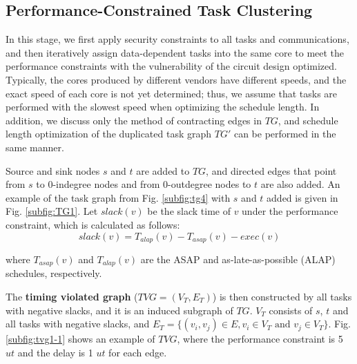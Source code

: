 \documentclass[10pt,journal, compsoc]{IEEEtran}
\begin{document}
\subsection{Performance-Constrained Task Clustering}

In this stage, we first apply security constraints to all tasks and communications, and then iteratively assign data-dependent tasks into the same core to meet the performance constraints with the vulnerability of the circuit design optimized. Typically, the cores produced by different vendors have different speeds, and the exact speed of each core is not yet determined; thus, we assume that tasks are performed with the slowest speed when optimizing the schedule length. In addition, we discuss only the method of contracting edges in $TG$, and schedule length optimization of the duplicated task graph $TG'$ can be performed in the same manner.

Source and sink nodes $s$ and $t$ are added to $TG$, and directed edges that point from $s$ to 0-indegree nodes and from 0-outdegree nodes to $t$ are also added. An example of the task graph from Fig. \ref{subfig:tg4} with $s$ and $t$ added is given in Fig. \ref{subfig:TG1}. Let $slack(v)$ be the slack time of $v$ under the performance constraint, which is calculated as follows:
\begin{equation}
slack(v) = T_{alap}(v)-T_{asap}(v)-exec(v)
\end{equation}

\noindent where $T_{asap}(v)$ and $T_{alap}(v)$ are the ASAP and as-late-as-possible (ALAP) schedules, respectively.


The \textbf{timing violated graph} ($TVG=(V_T, E_T)$) is then constructed by all tasks with negative slacks, and it is an induced subgraph of $TG$. $V_T$ consists of $s$, $t$ and all tasks with negative slacks, and $E_T=\{(v_i,v_j)\in E, v_i\in V_T \textrm{~and~} v_j\in V_T\}$. Fig. \ref{subfig:tvg1-1} shows an example of $TVG$, where the performance constraint is 5 $ut$ and the delay is 1 $ut$ for each edge.
\end{document}
